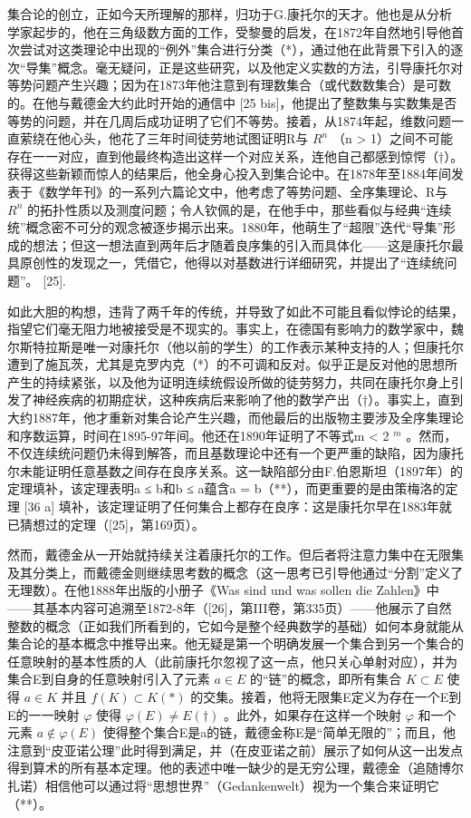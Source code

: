 集合论的创立，正如今天所理解的那样，归功于G.康托尔的天才。他也是从分析学家起步的，他在三角级数方面的工作，受黎曼的启发，在1872年自然地引导他首次尝试对这类理论中出现的“例外”集合进行分类（*），通过他在此背景下引入的逐次“导集”概念。毫无疑问，正是这些研究，以及他定义实数的方法，引导康托尔对等势问题产生兴趣；因为在1873年他注意到有理数集合（或代数数集合）是可数的。在他与戴德金大约此时开始的通信中 {[}25 bis{]}，他提出了整数集与实数集是否等势的问题，并在几周后成功证明了它们不等势。接着，从1874年起，维数问题一直萦绕在他心头，他花了三年时间徒劳地试图证明R与 \(R^{n}\) （n \textgreater{} 1）之间不可能存在一一对应，直到他最终构造出这样一个对应关系，连他自己都感到惊愕（†）。获得这些新颖而惊人的结果后，他全身心投入到集合论中。在1878年至1884年间发表于《数学年刊》的一系列六篇论文中，他考虑了等势问题、全序集理论、R与 \(R^{n}\) 的拓扑性质以及测度问题；令人钦佩的是，在他手中，那些看似与经典“连续统”概念密不可分的观念被逐步揭示出来。1880年，他萌生了“超限”迭代“导集”形成的想法；但这一想法直到两年后才随着良序集的引入而具体化——这是康托尔最具原创性的发现之一，凭借它，他得以对基数进行详细研究，并提出了“连续统问题”。 {[}25{]}.

如此大胆的构想，违背了两千年的传统，并导致了如此不可能且看似悖论的结果，指望它们毫无阻力地被接受是不现实的。事实上，在德国有影响力的数学家中，魏尔斯特拉斯是唯一对康托尔（他以前的学生）的工作表示某种支持的人；但康托尔遭到了施瓦茨，尤其是克罗内克（*）的不可调和反对。似乎正是反对他的思想所产生的持续紧张，以及他为证明连续统假设所做的徒劳努力，共同在康托尔身上引发了神经疾病的初期症状，这种疾病后来影响了他的数学产出（†）。事实上，直到大约1887年，他才重新对集合论产生兴趣，而他最后的出版物主要涉及全序集理论和序数运算，时间在1895-97年间。他还在1890年证明了不等式m \textless{} 2 \(^{m}\) 。然而，不仅连续统问题仍未得到解答，而且基数理论中还有一个更严重的缺陷，因为康托尔未能证明任意基数之间存在良序关系。这一缺陷部分由F.伯恩斯坦（1897年）的定理填补，该定理表明a ≤ b和b ≤ a蕴含a = b（**），而更重要的是由策梅洛的定理 {[}36 a{]} 填补，该定理证明了任何集合上都存在良序：这是康托尔早在1883年就已猜想过的定理（{[}25{]}，第169页）。

然而，戴德金从一开始就持续关注着康托尔的工作。但后者将注意力集中在无限集及其分类上，而戴德金则继续思考数的概念（这一思考已引导他通过“分割”定义了无理数）。在他1888年出版的小册子《Was sind und was sollen die Zahlen》中——其基本内容可追溯至1872-8年（{[}26{]}，第III卷，第335页）——他展示了自然整数的概念（正如我们所看到的，它如今是整个经典数学的基础）如何本身就能从集合论的基本概念中推导出来。他无疑是第一个明确发展一个集合到另一个集合的任意映射的基本性质的人（此前康托尔忽视了这一点，他只关心单射对应），并为集合E到自身的任意映射f引入了元素 \(a \in E\) 的“链”的概念，即所有集合 \(K \subset E\) 使得 \(a \in K\) 并且 \(f(K) \subset K (*)\) 的交集。接着，他将无限集E定义为存在一个E到E的一一映射 \(\varphi\) 使得 \(\varphi(E) \neq E (\dagger)\) 。此外，如果存在这样一个映射 \(\varphi\) 和一个元素 \(a \notin \varphi(E)\) 使得整个集合E是a的链，戴德金称E是“简单无限的”；而且，他注意到“皮亚诺公理”此时得到满足，并（在皮亚诺之前）展示了如何从这一出发点得到算术的所有基本定理。他的表述中唯一缺少的是无穷公理，戴德金（追随博尔扎诺）相信他可以通过将“思想世界”（Gedankenwelt）视为一个集合来证明它（**）。

